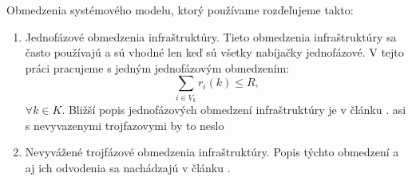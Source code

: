 




















Obmedzenia systémového modelu, ktorý používame rozďeľujeme takto:


\begin{enumerate}
    \item Jednofázové obmedzenia infraštruktúry. Tieto obmedzenia infraštruktúry sa často používajú a sú vhodné len keď sú všetky nabíjačky jednofázové. V tejto práci pracujeme s jedným jednofázovým obmedzením:
    \begin{equation}
        \sum_{i \in V_{k}} r_{i}(k) \leq R,
    \end{equation}
    $\forall k \in K$. Bližší popis jednofázových obmedzení infraštruktúry je v článku \cite{Lee2018LargeScaleAE}.
    asi s nevyvazenymi trojfazovymi by to neslo
    \item Nevyvážené trojfázové obmedzenia infraštruktúry. Popis týchto obmedzení a aj ich odvodenia sa nachádzajú v článku \cite{Lee2018LargeScaleAE}.
\end{enumerate}


